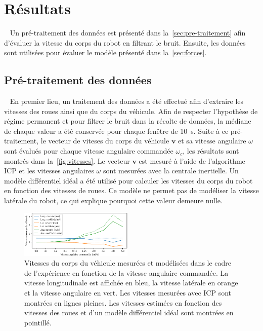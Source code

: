 \section{Résultats}~\label{sec:resultats}
Un pré-traitement des données est présenté dans la~\autoref{sec:pre-traitement} afin d'évaluer la vitesse du corps du robot en filtrant le bruit.
Ensuite, les données sont utilisées pour évaluer le modèle présenté dans la~\autoref{sec:forces}.

\subsection{Pré-traitement des données}~\label{sec:pre-traitement}
En premier lieu, un traitement des données a été effectué afin d'extraire les vitesses des roues ainsi que du corps du véhicule.
Afin de respecter l'hypothèse de régime permanent et pour filtrer le bruit dans la récolte de données, la médiane de chaque valeur a été conservée pour chaque fenêtre de \SI{10}{\second}.
Suite à ce pré-traitement, le vecteur de viteses du corps du véhicule $\bm v$ et sa vitesse angulaire $\omega$ sont évalués pour chaque vitesse angulaire commandée $\omega_c$, les résultats sont montrés dans la~\autoref{fig:vitesses}.
Le vecteur $\bm v$ est mesuré à l'aide de l'algorithme \ac{ICP} et les vitesses angulaires $\omega$ sont mesurées avec la centrale inertielle.
Un modèle différentiel idéal a été utilisé pour calculer les vitesses du corps du robot en fonction des vitesses de roues. 
Ce modèle ne permet pas de modéliser la vitesse latérale du robot, ce qui explique pourquoi cette valeur demeure nulle.

\begin{figure}[htpb]
	\centering
	\includegraphics[width=0.48\textwidth]{figs/body_vels.pdf}
	\caption{Vitesses du corps du véhicule mesurées et modélisées dans le cadre de l'expérience en fonction de la vitesse angulaire commandée.
			La vitesse longitudinale est affichée en bleu, la vitesse latérale en orange et la vitesse angulaire en vert.
			Les vitesses mesurées avec \ac{ICP} sont montrées en lignes pleines. 
			Les vitesses estimées en fonction des vitesses des roues et d'un modèle différentiel idéal sont montrées en pointillé.}
	\label{fig:vitesses}
\end{figure}

